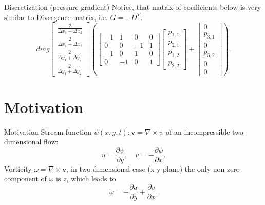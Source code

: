 \documentclass{beamer}
\begin{document}
	
	\begin{frame}{Discretization (pressure gradient)}
	Notice, that matrix of coefficients below is very similar to Divergence matrix, i.e. $G=-D^T$.
	\begin{equation}\label{eqn:gradient-matrix}
	diag\left[\begin{array}{cccccc}
	\frac{2}{\Delta x_1+\Delta x_2} \\
	\frac{2}{\Delta x_1+\Delta x_2} \\
	\frac{2}{\Delta y_1+\Delta y_2} \\
	\frac{2}{\Delta y_1+\Delta y_2}
	\end{array}\right]
	\left(\left[\begin{array}{rrrr}
	-1 & 1 & 0 & 0 \\
	0 & 0 & -1 & 1 \\
	-1 & 0 & 1 & 0 \\
	0 & -1 & 0 & 1
	\end{array}\right]
	\begin{bmatrix}{}
	  p_{1,1} \\
	  p_{2,1} \\
	  p_{1,2} \\
	  p_{2,2} 
	\end{bmatrix}
	+\left[\begin{array}{c}
	0 \\
	p_{3,1} \\
	0 \\
	 p_{3,2} \\
	0 \\
	0
	\end{array}\right]\right).
	\end{equation}
	\end{frame}
	
	




	
	
	\section{Motivation}
	\begin{frame}{Motivation}
	Stream function $\psi(x,y,t):\boldsymbol{v}=\nabla \times \psi$ of an incompressible two-dimensional flow:
	\begin{equation}
	\label{eqn:streamfunction}
		u = \frac{\partial \psi}{\partial y},\quad v=-\frac{\partial \psi}{\partial x}.
	\end{equation}
	Vorticity $\omega = \nabla \times \boldsymbol{v}$, in two-dimensional case (x-y-plane) the only non-zero component of $\omega$ is $z$, which leads to
	\begin{equation}
	\label{eqn:vorticity}
		\omega=- \frac{\partial u}{\partial y}+\frac{\partial v}{\partial x}.
	\end{equation}
	\end{frame}
  
\end{document}
